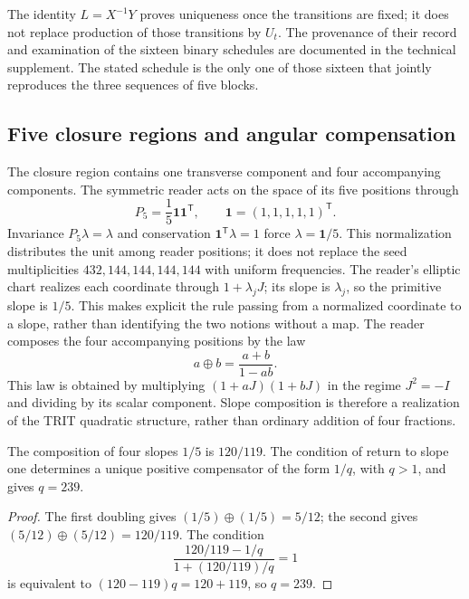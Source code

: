 The identity \(L=X^{-1}Y\) proves uniqueness once the transitions are fixed; it does not replace production of those transitions by \(U_t\). The provenance of their record and examination of the sixteen binary schedules are documented in the technical supplement. The stated schedule is the only one of those sixteen that jointly reproduces the three sequences of five blocks.

\subsection{Five closure regions and angular compensation}

The closure region contains one transverse component and four accompanying components. The symmetric reader acts on the space of its five positions through
\[
 P_5=\frac15\mathbf1\mathbf1^{\mathsf T},\qquad
 \mathbf1=(1,1,1,1,1)^{\mathsf T}.
\]
Invariance \(P_5\lambda=\lambda\) and conservation \(\mathbf1^{\mathsf T}\lambda=1\) force \(\lambda=\mathbf1/5\). This normalization distributes the unit among reader positions; it does not replace the seed multiplicities \(432,144,144,144,144\) with uniform frequencies. The reader's elliptic chart realizes each coordinate through \(1+\lambda_jJ\); its slope is \(\lambda_j\), so the primitive slope is \(1/5\). This makes explicit the rule passing from a normalized coordinate to a slope, rather than identifying the two notions without a map. The reader composes the four accompanying positions by the law
\begin{equation}
 a\oplus b=\frac{a+b}{1-ab}.
 \label{eq:suma-pendientes}
\end{equation}
This law is obtained by multiplying \((1+aJ)(1+bJ)\) in the regime \(J^2=-I\) and dividing by its scalar component. Slope composition is therefore a realization of the TRIT quadratic structure, rather than ordinary addition of four fractions.

\begin{proposition}
The composition of four slopes \(1/5\) is \(120/119\). The condition of return to slope one determines a unique positive compensator of the form \(1/q\), with \(q>1\), and gives \(q=239\).
\end{proposition}
\begin{proof}
The first doubling gives \((1/5)\oplus(1/5)=5/12\); the second gives \((5/12)\oplus(5/12)=120/119\). The condition
\[
 \frac{120/119-1/q}{1+(120/119)/q}=1
\]
is equivalent to \((120-119)q=120+119\), so \(q=239\).
\end{proof}


